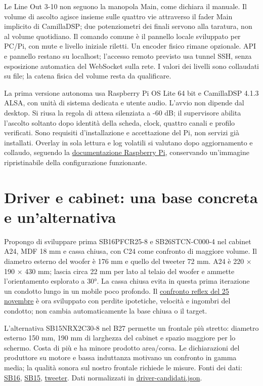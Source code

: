 \documentclass[
  italian,
  11pt,
  a4paper,
]{article}
\begin{document}
Le Line Out 3-10 non seguono la manopola Main, come dichiara il manuale. Il volume di
ascolto agisce insieme sulle quattro vie attraverso il fader Main implicito di CamillaDSP;
due potenziometri dei finali servono alla taratura, non al volume quotidiano. Il comando
comune è il pannello locale sviluppato per PC/Pi, con mute e livello iniziale riletti. Un
encoder fisico rimane opzionale. API e pannello restano su localhost; l'accesso remoto
previsto usa tunnel SSH, senza esposizione automatica del WebSocket sulla rete. I valori dei
livelli sono collaudati su file; la catena fisica del volume resta da qualificare.

La prima versione autonoma usa Raspberry Pi OS Lite 64 bit e CamillaDSP 4.1.3 ALSA, con
unità di sistema dedicata e utente audio. L'avvio non dipende dal desktop. Si riusa la
regola di attesa silenziata a -60 dB; il supervisore abilita l'ascolto soltanto dopo
identità della scheda, clock, quattro canali e profilo verificati. Sono requisiti
d'installazione e accettazione del Pi, non servizi già installati. Overlay in sola lettura e
log volatili si valutano dopo aggiornamento e collaudo, seguendo la
\href{https://www.raspberrypi.com/documentation/computers/configuration.html}{documentazione
Raspberry Pi}, conservando un'immagine ripristinabile della configurazione funzionante.

\section{Driver e cabinet: una base concreta e
un'alternativa}\label{driver-e-cabinet-una-base-concreta-e-unalternativa}

Propongo di sviluppare prima SB16PFCR25-8 e SB26STCN-C000-4 nel cabinet A24, MDF 18 mm e
cassa chiusa, con C24 come confronto di maggiore volume. Il diametro esterno del woofer è
176 mm e quello del tweeter 72 mm. A24 è 220 × 190 × 430 mm; lascia circa 22 mm per lato al
telaio del woofer e ammette l'orientamento esplorato a 30°. La cassa chiusa evita in questa
prima iterazione un condotto lungo in un mobile poco profondo. Il
\href{reflex-direttivita-cabinet.pdf}{confronto reflex del 25 novembre} è ora sviluppato con
perdite ipotetiche, velocità e ingombri del condotto; non cambia automaticamente la base
chiusa o il target.

L'alternativa SB15NRX2C30-8 nel B27 permette un frontale più stretto: diametro esterno 150
mm, 190 mm di larghezza del cabinet e spazio maggiore per lo schermo. Costa di più e ha
minore prodotto area/corsa. Le dichiarazioni del produttore su motore e bassa induttanza
motivano un confronto in gamma media; la qualità sonora sul nostro frontale richiede le
misure. Fonti dei dati:
\href{https://sbacoustics.com/wp-content/uploads/2024/01/6in-SB16PFCR25-8.pdf}{SB16},
\href{https://sbacoustics.com/wp-content/uploads/2020/02/5in-SB15NRX2C30-8.pdf}{SB15},
\href{https://sbacoustics.com/wp-content/uploads/2020/02/SB26STCN-C000-4.pdf}{tweeter}. Dati
normalizzati in \href{../../data/driver-candidati.json}{driver-candidati.json}.
\end{document}
